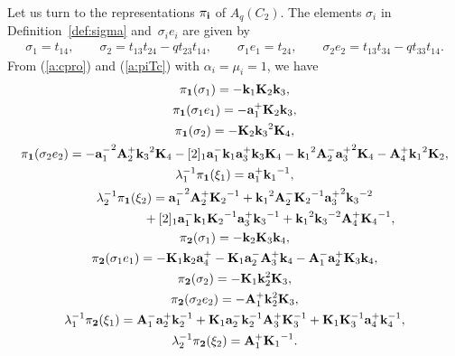 \documentclass[pdftex]{sigma}
\begin{document}
Let us turn to the representations $\pi_{{\bf i}}$ of $A_q(C_2)$.
The elements $\sigma_i$ in Def\/inition~\ref{def:sigma}
and~$\sigma_ie_i$
are given by
\begin{gather}\label{c:kobetsu}
\sigma_1 = t_{14}, \qquad
\sigma_2 = t_{13}t_{24}-qt_{23}t_{14},\qquad
\sigma_1 e_1 = t_{24},\qquad
\sigma_2e_2 = t_{13}t_{34}-qt_{33}t_{14}.
\end{gather}
From (\ref{a:cpro}) and (\ref{a:piTc}) with $\alpha_i=\mu_i=1$, we have
\begin{gather*}
\pi_{\bf 1}(\sigma_1)=- {{\bf k}_1}
{{\bf K}_2} {{\bf k}_3},\\
\pi_{\bf 1}(\sigma_1e_1)=- {{\bf a}^+_1}
{{\bf K}_2} {{\bf k}_3},\\
\pi_{\bf 1}(\sigma_2)=- {{\bf K}_2}
{{\bf k}_3}^{2} {{\bf K}_4},\\
\pi_{\bf 1}(\sigma_2e_2)=- {{\bf a}^-_1}^2
{{\bf A}^+_2} {{\bf k}_3}^{2} {{\bf K}_4}
-[2]_1 {{\bf a}^-_1} {{\bf k}_1}
{{\bf a}^+_3} {{\bf k}_3} {{\bf K}_4}
- {{\bf k}_1}^{2} {{\bf A}^-_2} {{\bf a}^+_3}^2
{{\bf K}_4}
- {{\bf A}^+_4} {{\bf k}_1}^{2} {{\bf K}_2},\\
\lambda_1^{-1}\pi_{\bf 1}(\xi_1)={{\bf a}^
+_1} {{\bf k}_1}^{-1},\\
\lambda_2^{-1}\pi_{\bf 1}(\xi_2) ={{\bf a}^-
_1}^2 {{\bf A}^+_2} {{\bf K}_2}^{-1}
+{{\bf k}_1}^{2} {{\bf A}^-_2} {{\bf K}_2}^{-1}
{{\bf a}^+_3}^2 {{\bf k}_3}^{-2}\\
\hphantom{\lambda_2^{-1}\pi_{\bf 1}(\xi_2) =}{}
+[2]_1 {{\bf a}^-_1} {{\bf k}_1}
{{\bf K}_2}^{-1} {{\bf a}^+_3} {{\bf k}_3}^{-1}
+{{\bf k}_1}^{2} {{\bf k}_3}^{-2} {{\bf A}^+_4}
{{\bf K}_4}^{-1},\\
\pi_{\bf 2}(\sigma_1)=- {\bf k}_2 {\bf
K}_3 {\bf k}_4,\\
\pi_{\bf 2}(\sigma_1e_1) =- {{\bf K}_1}
{\bf k}_2 {{\bf a}^+_4}
- {{\bf K}_1} {{\bf a}^-_2} {{\bf A}^+_3} {\bf
k}_4
- {{\bf A}^-_1} {{\bf a}^+_2} {\bf K}_3 {\bf k}
_4,\\
\pi_{\bf 2}(\sigma_2)=- {{\bf K}_1}
{\bf k}_2^2 {\bf K}_3,\\
\pi_{\bf 2}(\sigma_2e_2)=- {{\bf A}^+_1}
{\bf k}_2^2 {\bf K}_3,\\
\lambda_1^{-1}\pi_{\bf 2}(\xi_1)={{\bf A}^-
_1} {{\bf a}^+_2} {\bf k}_2^{-1}
+{{\bf K}_1} {{\bf a}^-_2} {\bf k}_2^{-1}
{{\bf A}^+_3} {\bf K}_3^{-1}
+{{\bf K}_1} {\bf K}_3^{-1} {{\bf a}^+_4} {\bf
k}_4^{-1},\\
\lambda_2^{-1}\pi_{\bf 2}(\xi_2)={{\bf A}^
+_1} {{\bf K}_1}^{-1}.
\end{gather*}
\end{document}

